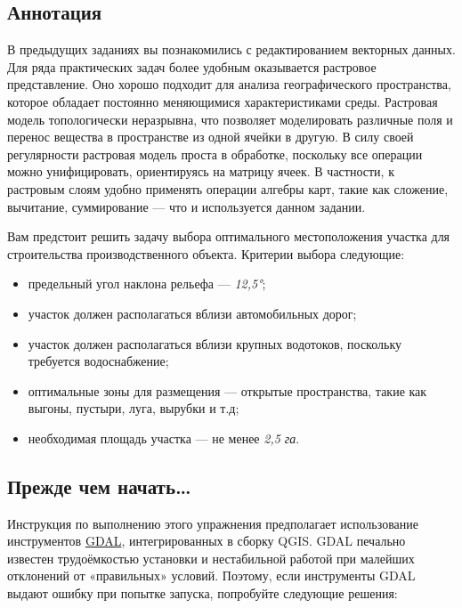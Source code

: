 \documentclass[
  12pt,
]{book}
\begin{document}
\hypertarget{weighted-overlay-annotation}{%
\subsection{Аннотация}\label{weighted-overlay-annotation}}

В предыдущих заданиях вы познакомились с редактированием векторных данных. Для ряда практических задач более удобным оказывается растровое представление. Оно хорошо подходит для анализа географического пространства, которое обладает постоянно меняющимися характеристиками среды. Растровая модель топологически неразрывна, что позволяет моделировать различные поля и перенос вещества в пространстве из одной ячейки в другую. В силу своей регулярности растровая модель проста в обработке, поскольку все операции можно унифицировать, ориентируясь на матрицу ячеек. В частности, к растровым слоям удобно применять операции алгебры карт, такие как сложение, вычитание, суммирование --- что и используется данном задании.

Вам предстоит решить задачу выбора оптимального местоположения участка для строительства производственного объекта. Критерии выбора следующие:

\begin{itemize}
\item
  предельный угол наклона рельефа --- \emph{12,5°};
\item
  участок должен располагаться вблизи автомобильных дорог;
\item
  участок должен располагаться вблизи крупных водотоков, поскольку требуется водоснабжение;
\item
  оптимальные зоны для размещения --- открытые пространства, такие как выгоны, пустыри, луга, вырубки и т.д;
\item
  необходимая площадь участка --- не менее \emph{2,5 га}.
\end{itemize}

\hypertarget{weighted-overlay-warning}{%
\subsection{Прежде чем начать\ldots{}}\label{weighted-overlay-warning}}

Инструкция по выполнению этого упражнения предполагает использование инструментов \href{https://gdal.org/}{GDAL}, интегрированных в сборку QGIS. GDAL печально известен трудоёмкостью установки и нестабильной работой при малейших отклонений от «правильных» условий. Поэтому, если инструменты GDAL выдают ошибку при попытке запуска, попробуйте следующие решения:
\end{document}
